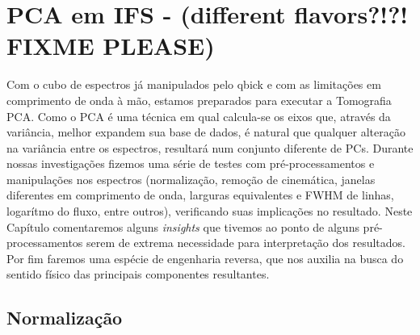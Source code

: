 



\chapter{PCA em IFS - (different flavors?!?! FIXME PLEASE)}
\label{sec:cap4}

\fixme Com o cubo de espectros já manipulados pelo {\sc qbick} e com as limitações em comprimento de onda à mão, estamos
preparados para executar a Tomografia PCA. Como o PCA é uma técnica em qual calcula-se os eixos que, através da
variância, melhor expandem sua base de dados, é natural que qualquer alteração na variância entre os espectros,
resultará num conjunto diferente de PCs. Durante nossas investigações fizemos uma série de testes com pré-processamentos
e manipulações nos espectros (normalização, remoção de cinemática, janelas diferentes em comprimento de onda, larguras
equivalentes e FWHM de linhas, logarítmo do fluxo, entre outros), verificando suas implicações no resultado. Neste
Capítulo comentaremos alguns {\em insights} que tivemos ao ponto de alguns pré-processamentos serem de extrema
necessidade para interpretação dos resultados. Por fim faremos uma espécie de engenharia reversa, que nos auxilia na
busca do sentido físico das principais componentes resultantes.

\section{Normalização}
\label{sec:cap4:norm}

